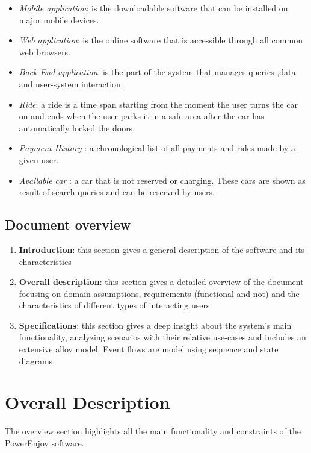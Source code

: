 \documentclass[12pt]{article}
\begin{document}
\begin{itemize}
	\item \textit{Mobile application}: is the downloadable software that can be installed on major mobile devices.
	\item \textit{Web application}: is the online software that is accessible through all common web browsers.
	\item \textit{Back-End application}: is the part of the system that manages queries ,data and user-system interaction.
	\item \textit{Ride}: a ride is a time span starting from the moment the user turns the car on and ends when the user parks it in a safe area after the car has automatically locked the doors.
	\item \textit{Payment History} : a chronological list of all payments and rides made by a given user.
	\item \textit{Available car} : a car that is not reserved or charging. These cars are shown as result of search queries and can be reserved by users.
	\end{itemize}		
	
	\subsection{Document overview}
	\begin{enumerate}
		\item \textbf{Introduction}: this section gives a general 	description of the software and its characteristics 
		\item \textbf{Overall description}: this section gives a detailed overview of the document focusing on domain assumptions, requirements (functional and not) and the characteristics of different types of interacting users.
		\item \textbf{Specifications}: this section gives a deep insight about the system's main functionality, analyzing scenarios with their relative use-cases and includes an extensive alloy model. Event flows are model using sequence and state diagrams.
	\end{enumerate}	
	
	\newpage
	\section{\Large Overall Description}
	The overview section highlights all the main functionality and constraints of the PowerEnjoy software.  
\end{document}

